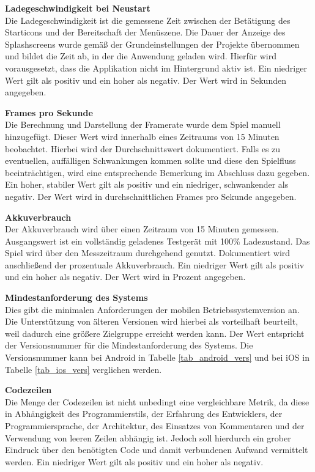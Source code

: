 \bigskip
\textbf{Ladegeschwindigkeit bei Neustart} \\
Die Ladegeschwindigkeit ist die gemessene Zeit zwischen der Betätigung des Starticons und der Bereitschaft der Menüszene. Die Dauer der Anzeige des Splashscreens wurde gemäß der Grundeinstellungen der Projekte übernommen und bildet die Zeit ab, in der die Anwendung geladen wird. Hierfür wird vorausgesetzt, dass die Applikation nicht im Hintergrund aktiv ist. Ein niedriger Wert gilt als positiv und ein hoher als negativ. Der Wert wird in Sekunden angegeben.

\bigskip
\textbf{Frames pro Sekunde} \\
Die Berechnung und Darstellung der Framerate wurde dem Spiel manuell hinzugefügt. Dieser Wert wird innerhalb eines Zeitraums von 15 Minuten beobachtet. Hierbei wird der Durchschnittswert dokumentiert. Falls es zu eventuellen, auffälligen Schwankungen kommen sollte und diese den Spielfluss beeinträchtigen, wird eine entsprechende Bemerkung im Abschluss dazu gegeben. Ein hoher, stabiler Wert gilt als positiv und ein niedriger, schwankender als negativ. Der Wert wird in durchschnittlichen Frames pro Sekunde angegeben.

\bigskip
\textbf{Akkuverbrauch} \\
Der Akkuverbrauch wird über einen Zeitraum von 15 Minuten gemessen. Ausgangswert ist ein vollständig geladenes Testgerät mit 100\% Ladezustand. Das Spiel wird über den Messzeitraum durchgehend genutzt. Dokumentiert wird anschließend der prozentuale Akkuverbrauch. Ein niedriger Wert gilt als positiv und ein hoher als negativ. Der Wert wird in Prozent angegeben.

\bigskip
\textbf{Mindestanforderung des Systems} \\
Dies gibt die minimalen Anforderungen der mobilen Betriebssystemversion an. Die Unterstützung von älteren Versionen wird hierbei als vorteilhaft beurteilt, weil dadurch eine größere Zielgruppe erreicht werden kann. Der Wert entspricht der Versionsnummer für die Mindestanforderung des Systems. Die Versionsnummer kann bei Android in Tabelle \ref{tab_android_vers} und bei iOS in Tabelle \ref{tab_ios_vers} verglichen werden.

\bigskip
\textbf{Codezeilen} \\
Die Menge der Codezeilen ist nicht unbedingt eine vergleichbare Metrik, da diese in Abhängigkeit des Programmierstils, der Erfahrung des Entwicklers, der Programmiersprache, der Architektur, des Einsatzes von Kommentaren und der Verwendung von leeren Zeilen abhängig ist. Jedoch soll hierdurch ein grober Eindruck über den benötigten Code und damit verbundenen Aufwand vermittelt werden. Ein niedriger Wert gilt als positiv und ein hoher als negativ.



